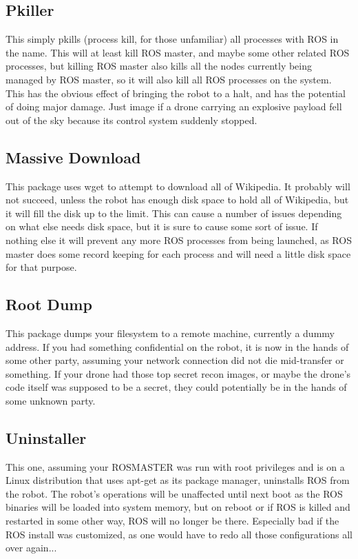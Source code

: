 \documentclass[IEEEtran,letterpaper,10pt,notitlepage,draftclsnofoot]{article}
\begin{document}
\subsection{Pkiller}
This simply pkills (process kill, for those unfamiliar) all processes with ROS in the name.
This will at least kill ROS master, and maybe some other related ROS processes, but killing ROS master also kills all the nodes currently being managed by ROS master, so it will also kill all ROS processes on the system.
This has the obvious effect of bringing the robot to a halt, and has the potential of doing major damage.
Just image if a drone carrying an explosive payload fell out of the sky because its control system suddenly stopped.

\subsection{Massive Download}
This package uses wget to attempt to download all of Wikipedia.
It probably will not succeed, unless the robot has enough disk space to hold all of Wikipedia, but it will fill the disk up to
the limit. This can cause a number of issues depending on what else needs disk space, but it is sure to cause some sort of
issue. If nothing else it will prevent any more ROS processes from being launched, as ROS master does some record keeping for
each process and will need a little disk space for that purpose.

\subsection{Root Dump}
This package dumps your filesystem to a remote machine, currently a dummy address. If you had something confidential on the
robot, it is now in the hands of some other party, assuming your network connection did not die mid-transfer or something.
If your drone had those top secret recon images, or maybe the drone's code itself was supposed to be a secret, they could
potentially be in the hands of some unknown party.

\subsection{Uninstaller}
This one, assuming your ROSMASTER was run with root privileges and is on a Linux distribution that uses apt-get as its package
manager, uninstalls ROS from the robot. The robot's operations will be unaffected until next boot as the ROS binaries will be
loaded into system memory, but on reboot or if ROS is killed and restarted in some other way, ROS will no longer be there.
Especially bad if the ROS install was customized, as one would have to redo all those configurations all over again...
\end{document}
